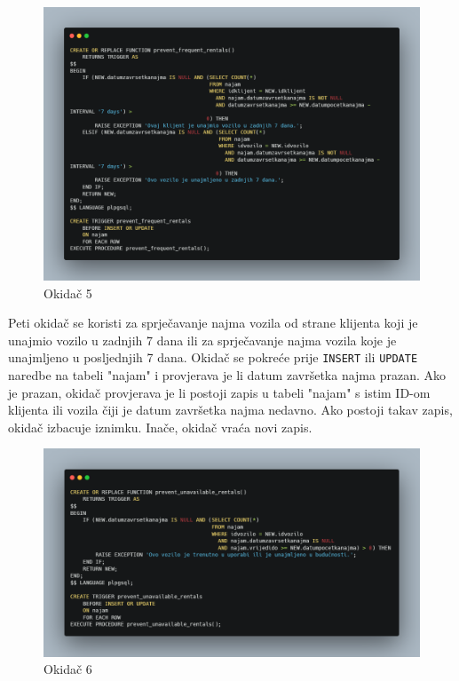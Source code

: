 \documentclass[]{foi}
\begin{document}
\begin{figure}[!ht]
    \centering
    \includegraphics[width=1\textwidth]{slike/5.png}
    \caption{Okidač 5}
    \label{fig:peti}
\end{figure}

Peti okidač se koristi za sprječavanje najma vozila od strane klijenta koji je unajmio vozilo u zadnjih 7 dana ili za sprječavanje najma vozila koje je unajmljeno u posljednjih 7 dana. Okidač se pokreće prije \texttt{INSERT} ili \texttt{UPDATE} naredbe na tabeli "najam" i provjerava je li datum završetka najma prazan. Ako je prazan, okidač provjerava je li postoji zapis u tabeli "najam" s istim ID-om klijenta ili vozila čiji je datum završetka najma nedavno. Ako postoji takav zapis, okidač izbacuje iznimku. Inače, okidač vraća novi zapis.
\newpage

\begin{figure}[!ht]
    \centering
    \includegraphics[width=1\textwidth]{slike/6.png}
    \caption{Okidač 6}
    \label{fig:sesti}
\end{figure}
\end{document}
